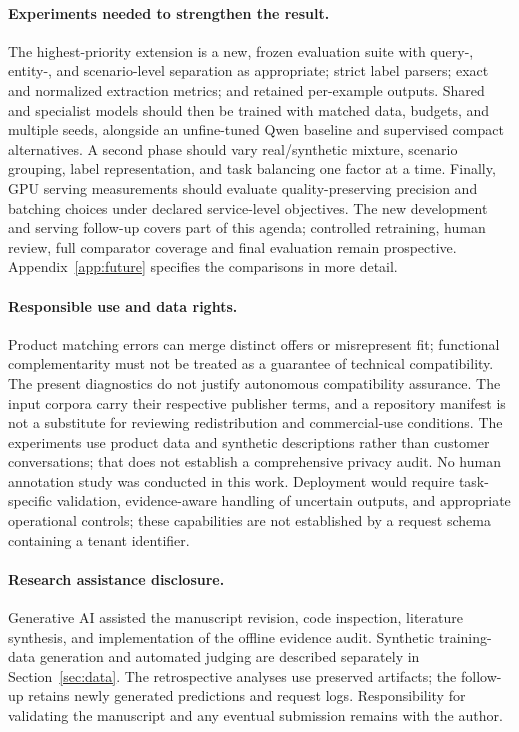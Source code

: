 \paragraph{Experiments needed to strengthen the result.}
The highest-priority extension is a new, frozen evaluation suite with query-, entity-, and scenario-level separation as appropriate; strict label parsers; exact and normalized extraction metrics; and retained per-example outputs. Shared and specialist models should then be trained with matched data, budgets, and multiple seeds, alongside an unfine-tuned Qwen baseline and supervised compact alternatives. A second phase should vary real/synthetic mixture, scenario grouping, label representation, and task balancing one factor at a time. Finally, GPU serving measurements should evaluate quality-preserving precision and batching choices under declared service-level objectives. The new development and serving follow-up covers part of this agenda; controlled retraining, human review, full comparator coverage and final evaluation remain prospective. Appendix~\ref{app:future} specifies the comparisons in more detail.

\paragraph{Responsible use and data rights.}
Product matching errors can merge distinct offers or misrepresent fit; functional complementarity must not be treated as a guarantee of technical compatibility. The present diagnostics do not justify autonomous compatibility assurance. The input corpora carry their respective publisher terms, and a repository manifest is not a substitute for reviewing redistribution and commercial-use conditions. The experiments use product data and synthetic descriptions rather than customer conversations; that does not establish a comprehensive privacy audit. No human annotation study was conducted in this work. Deployment would require task-specific validation, evidence-aware handling of uncertain outputs, and appropriate operational controls; these capabilities are not established by a request schema containing a tenant identifier.

\paragraph{Research assistance disclosure.}
Generative AI assisted the manuscript revision, code inspection, literature synthesis, and implementation of the offline evidence audit. Synthetic training-data generation and automated judging are described separately in Section~\ref{sec:data}. The retrospective analyses use preserved artifacts; the follow-up retains newly generated predictions and request logs. Responsibility for validating the manuscript and any eventual submission remains with the author.

